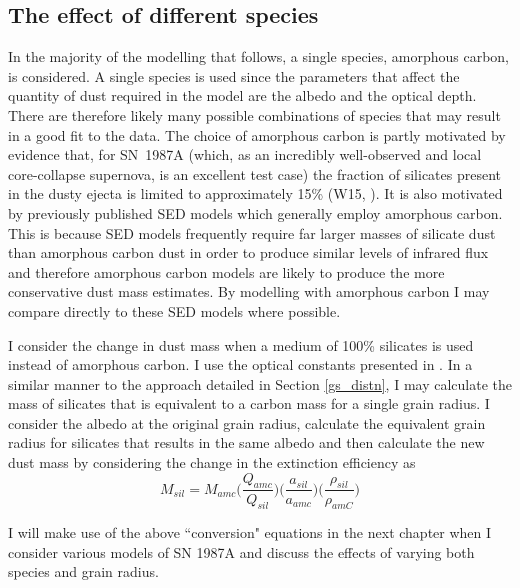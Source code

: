 \subsection{The effect of different species}
In the majority of the modelling that follows, a single species, amorphous carbon, is considered.   A single species is used since the parameters that affect the quantity of dust required in the model are the albedo and the optical depth.  There are therefore  likely many possible combinations of species that may result in a good fit to the data.  The choice of amorphous carbon is partly motivated by evidence that, for SN~1987A (which, as an incredibly well-observed and local core-collapse supernova, is an excellent test case) the fraction of silicates present in the dusty ejecta is limited to approximately 15\% (W15, \citet{Ercolano2007}).  It is also motivated by previously published SED models which generally employ amorphous carbon.  This is because SED models frequently require far larger masses of silicate dust than amorphous carbon dust in order to produce similar levels of infrared flux and therefore amorphous carbon models are likely to produce the more conservative dust mass estimates.  By modelling with amorphous carbon I may compare directly to these SED models where possible.

I consider the change in dust mass when a medium of 100\% silicates is used instead of amorphous carbon.  I use the optical constants presented in \cite{Draine1984}.  In a similar manner to the approach detailed in Section \ref{gs_distn}, I may calculate the mass of silicates that is equivalent to a carbon mass for a single grain radius.  I consider the albedo at the original grain radius, calculate the equivalent grain radius for silicates that results in the same albedo and then calculate the new dust mass by considering the change in the extinction efficiency as
\begin{equation}
\label{species_conversion}
M_{sil} = M_{amc} \Big( \frac{Q_{amc}}{Q_{sil}} \Big) \Big(\frac{a_{sil}}{a_{amc}}\Big) \Big(\frac{\rho_{sil}}{\rho_{amC}}\Big)
\end{equation}


I will make use of the above ``conversion" equations in the next chapter when I consider various models of SN 1987A and discuss the effects of varying both species and grain radius.

